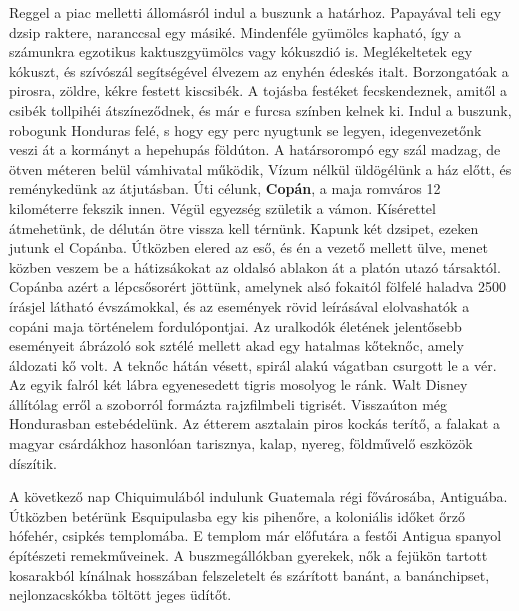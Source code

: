 Reggel a piac melletti állomásról indul a buszunk a határhoz. Papayával
teli egy dzsip raktere, naranccsal egy másiké. Mindenféle
gyümölcs kapható, így a számunkra egzotikus kaktuszgyümölcs vagy
kókuszdió is. Meglékeltetek egy kókuszt, és szívószál segítségével
élvezem az enyhén édeskés italt. Borzongatóak a pirosra, zöldre, kékre
festett kiscsibék. A tojásba festéket fecskendeznek, amitől a csibék
tollpihéi átszíneződnek, és már e furcsa színben kelnek ki. Indul a
buszunk, robogunk Honduras felé, s hogy egy perc nyugtunk se legyen,
idegenvezetőnk veszi át a kormányt a hepehupás földúton. A határsorompó
egy szál madzag, de ötven méteren belül vámhivatal működik,
Vízum nélkül üldögélünk a ház előtt, és reménykedünk az átjutásban.
Úti célunk, \textbf{Copán}, a maja romváros 12 kilométerre fekszik
innen. Végül egyezség születik a vámon. Kísérettel átmehetünk, de
délután ötre vissza kell térnünk. Kapunk két dzsipet, ezeken jutunk el
Copánba. Útközben elered az eső, és én a vezető mellett ülve, menet
közben veszem be a hátizsákokat az oldalsó ablakon át a platón utazó
társaktól. Copánba azért a lépcsősorért jöttünk, amelynek alsó fokaitól
fölfelé haladva 2500 írásjel látható évszámokkal, és az események
rövid leírásával elolvashatók a copáni maja történelem fordulópontjai.
Az uralkodók életének jelentősebb eseményeit ábrázoló sok sztélé
mellett akad egy hatalmas kőteknőc, amely áldozati kő volt. A teknőc
hátán vésett, spirál alakú vágatban csurgott le a vér. Az egyik falról két
lábra egyenesedett tigris mosolyog le ránk. Walt Disney állítólag erről
a szoborról formázta rajzfilmbeli tigrisét. Visszaúton még Hondurasban
estebédelünk. Az étterem asztalain piros kockás terítő, a falakat
a magyar csárdákhoz hasonlóan tarisznya, kalap, nyereg, földművelő
eszközök díszítik.


A következő nap Chiquimulából indulunk Guatemala régi fővárosába,
Antiguába. Útközben betérünk Esquipulasba egy kis pihenőre,
a koloniális időket őrző hófehér, csipkés templomába. E templom már
előfutára a festői Antigua spanyol építészeti remekműveinek.
A buszmegállókban gyerekek, nők a fejükön tartott kosarakból kínálnak
hosszában felszeletelt és szárított banánt, a banánchipset, nejlonzacskókba
töltött jeges üdítőt.

